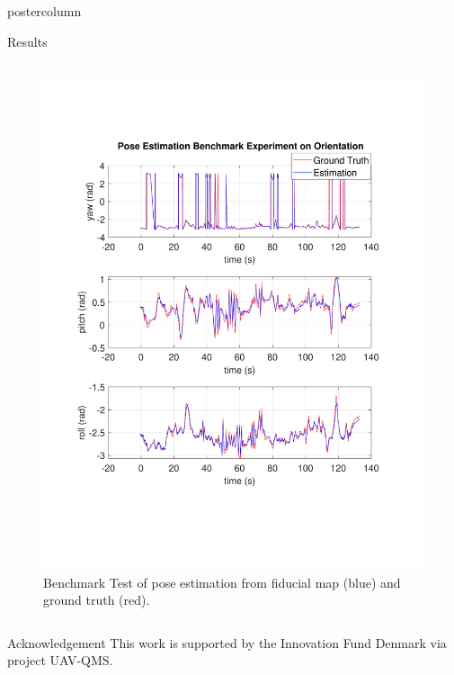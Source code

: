 \documentclass{beamer}
\begin{document}
\begin{frame}
\begin{columns}
\begin{column}{.57\textwidth}
\begin{beamercolorbox}[center]{postercolumn}
\begin{minipage}{.98\textwidth}
{\begin{myblock}{Results}
\begin{minipage}[0.3\textheight]{\textwidth}
\begin{columns}[T]
\begin{column}{0.33\textwidth}
\begin{figure}
\includegraphics[width=1.0\textwidth]{img/rpy_new}
\caption{Benchmark Test of pose estimation from fiducial map (blue) and ground truth (red).}
\label{fig:benchmark}
\end{figure}
\end{column}
%
\end{columns}
\end{minipage}
\end{myblock}\vfill
\begin{myblock}{Acknowledgement}
This work is supported by the Innovation Fund Denmark via project UAV-QMS.
\end{myblock}\vfill

			}\end{minipage}
		\end{beamercolorbox}
	\end{column}
\end{columns}
\end{frame}
\end{document}
